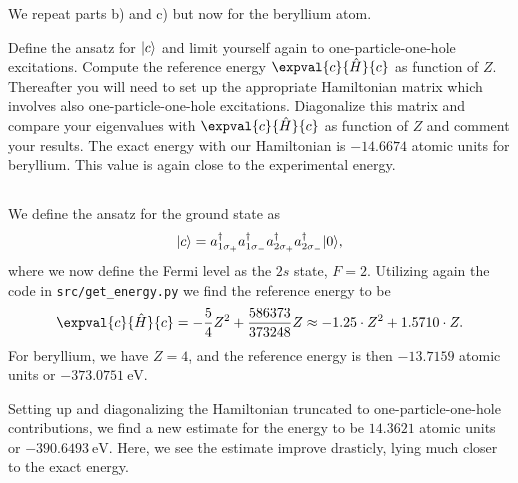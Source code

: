 We repeat parts b) and c) but now for the beryllium atom. %

Define the ansatz for $\lvert c\rangle$ and limit yourself again to one-particle-one-hole excitations.
Compute the reference energy $\expval{c}{\hat{H}}{c}$ as function of $Z$.
Thereafter you will need to set up the appropriate Hamiltonian matrix which involves also one-particle-one-hole excitations.
Diagonalize this matrix and compare your eigenvalues with $\expval{c}{\hat{H}}{c}$ as function of $Z$ and comment your results.
The exact energy with our Hamiltonian is $-14.6674$ atomic units for beryllium.
This value is again close to the experimental energy.

\subsection{}
We define the ansatz for the ground state as
\begin{equation}
    \lvert c\rangle = a^\dagger_{1\sigma_{+}} a^\dagger_{1\sigma_{-}} a^\dagger_{2\sigma_{+}} a^\dagger_{2\sigma_{-}} \lvert0\rangle,
\end{equation}
where we now define the Fermi level as the $2s$ state, $F = 2$.
Utilizing again the code in \verb|src/get_energy.py| we find the reference energy to be
\begin{equation}
    \expval{c}{\hat{H}}{c} = -\frac{5}{4} Z^2 + \frac{586373}{373248} Z \approx -1.25 \cdot Z^2 + 1.5710 \cdot Z.
\end{equation}
For beryllium, we have $Z = 4$, and the reference energy is then $-13.7159$ atomic units or $-373.0751 \ \text{eV}$.

Setting up and diagonalizing the Hamiltonian truncated to one-particle-one-hole contributions, we find a new estimate for the energy to be $14.3621$ atomic units or $-390.6493 \ \text{eV}$.
Here, we see the estimate improve drasticly, lying much closer to the exact energy.

